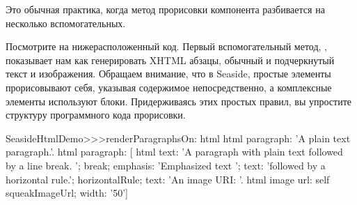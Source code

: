 \documentclass[a4paper,10pt,twoside]{book}
\begin{document}

Это обычная практика,
когда метод прорисовки компонента разбивается на несколько вспомогательных.




Посмотрите на нижерасположенный код.
Первый вспомогательный метод, ,
показывает нам как генерировать XHTML абзацы,
обычный и подчеркнутый текст и изображения.
Обращаем внимание, что в Seaside, простые элементы прорисовывают себя,
указывая содержимое непосредственно,
а комплексные элементы используют блоки.
Придерживаясь этих простых правил,
вы упростите структуру программного кода прорисовки.

\begin{code}{}
SeasideHtmlDemo>>>renderParagraphsOn: html 
	html paragraph: 'A plain text paragraph.'.
	html paragraph: [
		html
			text: 'A paragraph with plain text followed by a line break. ';
			break;
			emphasis: 'Emphasized text ';
			text: 'followed by a horizontal rule.';
			horizontalRule;
			text: 'An image URI: '.
		html image
			url: self squeakImageUrl;
			width: '50']
\end{code}

\end{document}
